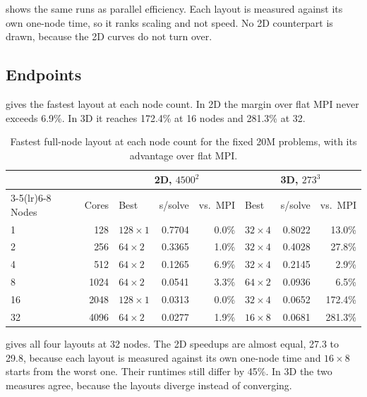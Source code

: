\documentclass[12pt,a4paper,notitlepage]{report}
\let\OldSubsection\subsection
\renewcommand{\subsection}{\FloatBarrier\OldSubsection}
\begin{document}
 shows the same runs as parallel efficiency. Each layout is
measured against its own one-node time, so it ranks scaling and not speed. No 2D
counterpart is drawn, because the 2D curves do not turn over.

\subsection{Endpoints}
\label{sec:strong-endpoints}
 gives the fastest layout at each node count. In 2D the margin
over flat MPI never exceeds 6.9\%. In 3D it reaches 172.4\% at 16 nodes and 281.3\% at 32.

\begin{table}[htbp]
  \centering
  \caption{Fastest full-node layout at each node count for the fixed 20M problems, with its
  advantage over flat MPI.}
  \label{tab:strong20m-best}
  \begin{tabular}{lrlrrlrr}
    \toprule
    & & \multicolumn{3}{c}{2D, $4500^2$} & \multicolumn{3}{c}{3D, $273^3$} \\
    \cmidrule(lr){3-5}\cmidrule(lr){6-8}
    Nodes & Cores & Best & s/solve & vs.\ MPI & Best & s/solve & vs.\ MPI \\
    \midrule
     1 &  128 & $128\times1$ & 0.7704 &  0.0\% & $32\times4$ & 0.8022 &  13.0\% \\
     2 &  256 & $64\times2$  & 0.3365 &  1.0\% & $32\times4$ & 0.4028 &  27.8\% \\
     4 &  512 & $64\times2$  & 0.1265 &  6.9\% & $32\times4$ & 0.2145 &   2.9\% \\
     8 & 1024 & $64\times2$  & 0.0541 &  3.3\% & $64\times2$ & 0.0936 &   6.5\% \\
    16 & 2048 & $128\times1$ & 0.0313 &  0.0\% & $32\times4$ & 0.0652 & 172.4\% \\
    32 & 4096 & $64\times2$  & 0.0277 &  1.9\% & $16\times8$ & 0.0681 & 281.3\% \\
    \bottomrule
  \end{tabular}
\end{table}

 gives all four layouts at 32 nodes. The 2D speedups are
almost equal, 27.3 to 29.8, because each layout is measured against its own one-node time
and $16\times8$ starts from the worst one. Their runtimes still differ by 45\%. In 3D the
two measures agree, because the layouts diverge instead of converging.
\end{document}
